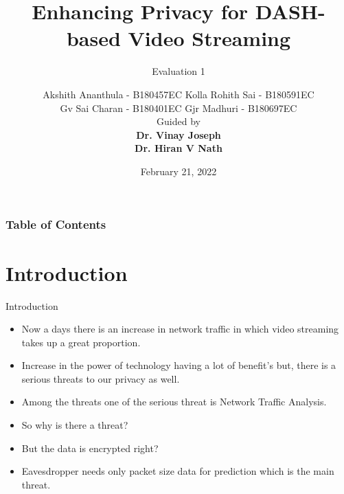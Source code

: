 \documentclass{beamer}
\title[Enhancing Privacy for DASH] %
{Enhancing Privacy for DASH-based Video
Streaming}
\subtitle{Evaluation 1}
\author[Group-11, B.tech (NITC)] %
{Akshith Ananthula - B180457EC \hspace{2em} Kolla Rohith Sai - B180591EC \\ Gv Sai Charan - B180401EC \hspace{2em} Gjr Madhuri - B180697EC \\ \vspace{1em} Guided by \\ \textbf{Dr. Vinay Joseph \\ Dr. Hiran V Nath}}
\institute[] %
{
  National Institute of Technology Calicut\\
  Department of Electronics and Communication Engineering
}
\date[February 21, 2022] %
{ February 21, 2022}
\begin{document}
\frame{\titlepage}


\begin{frame}
\frametitle{Table of Contents}
\tableofcontents
\end{frame}


\section{Introduction}
\begin{frame}{Introduction}
    \begin{itemize}
       \item Now a days there is an increase in network traffic in which video streaming takes up a great proportion. 
        \item Increase in the power of technology having a lot of benefit's but, there is a serious threats to our privacy as well. 
        \item Among the threats one of the serious threat is Network Traffic Analysis.
        \item So why is there a threat?
        \item But the data is encrypted right?
        \item Eavesdropper needs only packet size data for prediction which is the main threat. 
    \end{itemize}
\end{frame}
\end{document}
